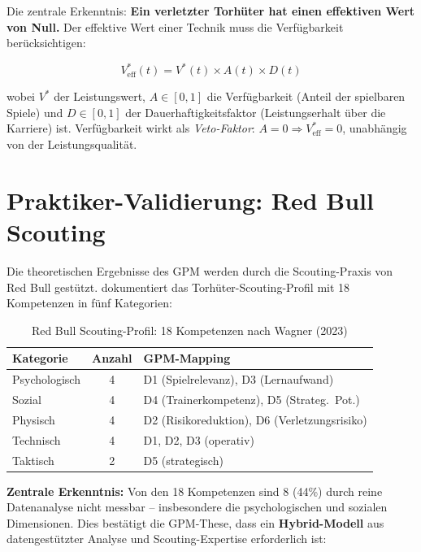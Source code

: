 \documentclass[12pt,a4paper]{article}
\begin{document}
Die zentrale Erkenntnis: \textbf{Ein verletzter Torh\"uter hat einen effektiven Wert von Null.} Der effektive Wert einer Technik muss die Verf\"ugbarkeit ber\"ucksichtigen:

\begin{equation}
\label{eq:veff}
V^{*}_{\text{eff}}(t) = V^{*}(t) \times A(t) \times D(t)
\end{equation}

\noindent wobei $V^{*}$ der Leistungswert, $A \in [0,1]$ die Verf\"ugbarkeit (Anteil der spielbaren Spiele) und $D \in [0,1]$ der Dauerhaftigkeitsfaktor (Leistungserhalt \"uber die Karriere) ist. Verf\"ugbarkeit wirkt als \emph{Veto-Faktor}: $A = 0 \Rightarrow V^{*}_{\text{eff}} = 0$, unabh\"angig von der Leistungsqualit\"at.


\section{Praktiker-Validierung: Red Bull Scouting}
\label{sec:redbull}

Die theoretischen Ergebnisse des GPM werden durch die Scouting-Praxis von Red Bull gest\"utzt. \citet{wagner2023scouting} dokumentiert das Torh\"uter-Scouting-Profil mit 18 Kompetenzen in f\"unf Kategorien:

\begin{table}[H]
\centering
\caption{Red Bull Scouting-Profil: 18 Kompetenzen nach Wagner (2023)}
\label{tab:redbull}
\begin{tabularx}{\textwidth}{@{}l c X@{}}
\toprule
\textbf{Kategorie} & \textbf{Anzahl} & \textbf{GPM-Mapping} \\
\midrule
Psychologisch & 4 & D1 (Spielrelevanz), D3 (Lernaufwand) \\[4pt]
Sozial & 4 & D4 (Trainerkompetenz), D5 (Strateg.\ Pot.) \\[4pt]
Physisch & 4 & D2 (Risikoreduktion), D6 (Verletzungsrisiko) \\[4pt]
Technisch & 4 & D1, D2, D3 (operativ) \\[4pt]
Taktisch & 2 & D5 (strategisch) \\
\bottomrule
\end{tabularx}
\end{table}

\textbf{Zentrale Erkenntnis:} Von den 18 Kompetenzen sind 8 (44\%) durch reine Datenanalyse nicht messbar -- insbesondere die psychologischen und sozialen Dimensionen. Dies best\"atigt die GPM-These, dass ein \textbf{Hybrid-Modell} aus datengest\"utzter Analyse und Scouting-Expertise erforderlich ist:
\end{document}
